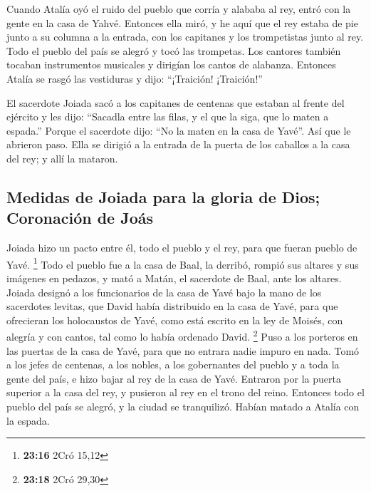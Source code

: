 \begin{paracol}{2}
 Cuando Atalía oyó el ruido del pueblo que corría y
alababa al rey, entró con la gente en la casa de Yahvé. 
Entonces ella miró, y he aquí que el rey estaba de pie junto a su
columna a la entrada, con los capitanes y los trompetistas junto al rey.
Todo el pueblo del país se alegró y tocó las trompetas. Los cantores
también tocaban instrumentos musicales y dirigían los cantos de
alabanza. Entonces Atalía se rasgó las vestiduras y dijo: ``¡Traición!
¡Traición!''

 El sacerdote Joiada sacó a los capitanes de centenas que
estaban al frente del ejército y les dijo: ``Sacadla entre las filas, y
el que la siga, que lo maten a espada.'' Porque el sacerdote dijo: ``No
la maten en la casa de Yavé''.  Así que le abrieron paso.
Ella se dirigió a la entrada de la puerta de los caballos a la casa del
rey; y allí la mataron.

\hypertarget{medidas-de-joiada-para-la-gloria-de-dios-coronaciuxf3n-de-jouxe1s}{%
\subsection{Medidas de Joiada para la gloria de Dios; Coronación de
Joás}\label{medidas-de-joiada-para-la-gloria-de-dios-coronaciuxf3n-de-jouxe1s}}

 Joiada hizo un pacto entre él, todo el pueblo y el rey,
para que fueran pueblo de Yavé. \footnote{\textbf{23:16} 2Cró 15,12}
 Todo el pueblo fue a la casa de Baal, la derribó, rompió
sus altares y sus imágenes en pedazos, y mató a Matán, el sacerdote de
Baal, ante los altares.  Joiada designó a los
funcionarios de la casa de Yavé bajo la mano de los sacerdotes levitas,
que David había distribuido en la casa de Yavé, para que ofrecieran los
holocaustos de Yavé, como está escrito en la ley de Moisés, con alegría
y con cantos, tal como lo había ordenado David. \footnote{\textbf{23:18}
  2Cró 29,30}  Puso a los porteros en las puertas de la
casa de Yavé, para que no entrara nadie impuro en nada. 
Tomó a los jefes de centenas, a los nobles, a los gobernantes del pueblo
y a toda la gente del país, e hizo bajar al rey de la casa de Yavé.
Entraron por la puerta superior a la casa del rey, y pusieron al rey en
el trono del reino.  Entonces todo el pueblo del país se
alegró, y la ciudad se tranquilizó. Habían matado a Atalía con la
espada.

\switchcolumn
\begin{otherlanguage}{english}


\end{otherlanguage}
\end{paracol}
